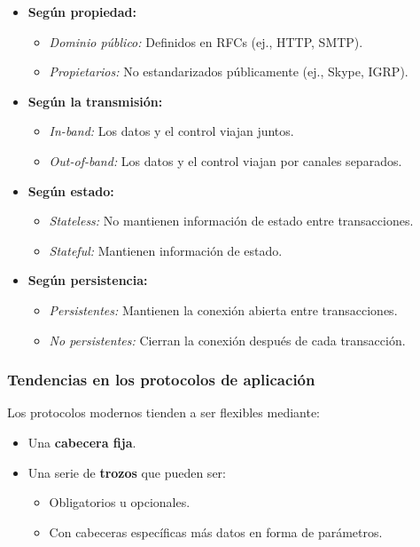 \documentclass[a4paper,12pt]{article}
\begin{document}
\begin{itemize}
    \item \textbf{Según propiedad:} 
    \begin{itemize}
        \item \emph{Dominio público:} Definidos en RFCs (ej., HTTP, SMTP).
        \item \emph{Propietarios:} No estandarizados públicamente (ej., Skype, IGRP).
    \end{itemize}
    
    \item \textbf{Según la transmisión:}
    \begin{itemize}
        \item \emph{In-band:} Los datos y el control viajan juntos.
        \item \emph{Out-of-band:} Los datos y el control viajan por canales separados.
    \end{itemize}
    
    \item \textbf{Según estado:}
    \begin{itemize}
        \item \emph{Stateless:} No mantienen información de estado entre transacciones.
        \item \emph{Stateful:} Mantienen información de estado.
    \end{itemize}
    
    \item \textbf{Según persistencia:}
    \begin{itemize}
        \item \emph{Persistentes:} Mantienen la conexión abierta entre transacciones.
        \item \emph{No persistentes:} Cierran la conexión después de cada transacción.
    \end{itemize}
\end{itemize}

\subsubsection{Tendencias en los protocolos de aplicación}

Los protocolos modernos tienden a ser flexibles mediante:

\begin{itemize}
    \item Una \textbf{cabecera fija}.
    \item Una serie de \textbf{trozos} que pueden ser:
    \begin{itemize}
        \item Obligatorios u opcionales.
        \item Con cabeceras específicas más datos en forma de parámetros.
    \end{itemize}
\end{itemize}
\end{document}
